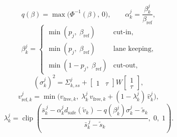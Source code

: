 \documentclass[letterpaper, 10 pt, journal]{IEEEtran}
\begin{document}
\begin{equation}
    q(\beta) = \max\!\big(\Phi^{-1}(\beta),\, 0\big), \qquad
    \alpha^j_k = \frac{\beta^j_k}{\beta_{\mathrm{ref}}},
    \label{eq:alpha}
\end{equation}
\begin{equation}
    \beta^j_k =
    \begin{cases}
        \min(p_j,\; \beta_{\mathrm{ref}}) & \text{cut-in}, \\
        \min(p_j,\; \beta_{\mathrm{ref}}) & \text{lane keeping}, \\
        \min(1 - p_j,\; \beta_{\mathrm{ref}}) & \text{cut-out},
    \end{cases}
    \label{eq:beta}
\end{equation}
\begin{equation}
    (\sigma^j_k)^2 = \Sigma^{j}_{k,ss} + \begin{bmatrix} 1 & \tau \end{bmatrix}
    W \begin{bmatrix} 1 \\ \tau \end{bmatrix},
    \label{eq:sigma}
\end{equation}
\begin{equation}
    v^j_{\mathrm{ref},k} = \min\!\big(v_{\mathrm{free},k},\;
    \lambda^j_k\, v_{\mathrm{free},k} + (1-\lambda^j_k)\, \hat v^j_k\big),
    \label{eq:vref}
\end{equation}
\begin{equation}
    \lambda^j_k = \operatorname{clip}\!\left(
        \frac{\bar s^{\,j}_k - \alpha^j_k d_{\mathrm{safe}}(\tilde v_k) - q(\beta^j_k)\sigma^j_k - \tilde s_k}
             {\bar s^{\,j}_k - \tilde s_k},\; 0,\; 1\right).
    \label{eq:vref_blend}
\end{equation}
\end{document}
